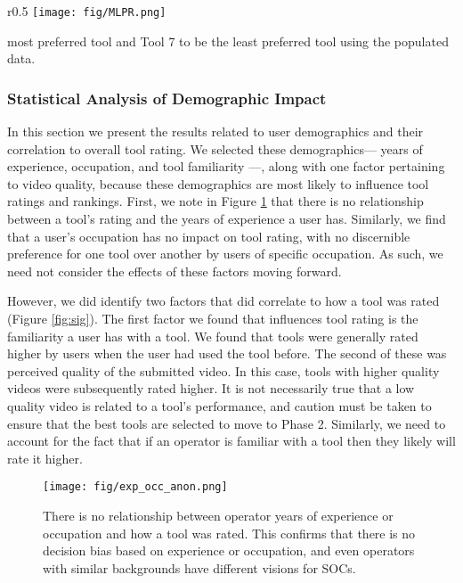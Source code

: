 \begin{wrapfigure}[10]{r}{0.5\textwidth}
    \vspace{-30pt}
    \centering
    \texttt{[image: fig/MLPR.png]}
    \captionsetup{font = scriptsize}
    \vspace{-10pt}
    \caption{PageRank graphical network from populated data based on ML algorithms.}
    \label{fig:MLresults}
\end{wrapfigure}
most preferred tool and Tool 7 to be the least preferred tool using the populated data. 

\subsubsection{Statistical Analysis of Demographic Impact}\label{correlation}
In this section we present the results related to user demographics and their correlation to overall tool rating. We selected these demographics--- years of experience, occupation, and tool familiarity ---, along with one factor pertaining to video quality, because these demographics are most likely to influence tool ratings and rankings. First, we note in Figure \ref{fig:exp} that there is no relationship between a tool's rating and the years of experience a user has. Similarly, we find that a user's occupation has no impact on tool rating, with no discernible preference for one tool over another by users of specific occupation. As such, we need not consider the effects of these factors moving forward.

However, we did identify two factors that did correlate to how a tool was rated (Figure \ref{fig:sig}). The first factor we found that influences tool rating is the familiarity a user has with a tool. We found that tools were generally rated higher by users when the user had used the tool before. The second of these was perceived quality of the submitted video. In this case, tools with higher quality videos were subsequently rated higher. It is not necessarily true that a low quality video is related to a tool's performance, and caution must be taken to ensure that the best tools are selected to move to Phase 2. Similarly, we need to account for the fact that if an operator is familiar with a tool then they likely will rate it higher.

\begin{figure}
    \vspace{-15pt}
    \centering
    \texttt{[image: fig/exp\_occ\_anon.png]}
    \captionsetup{font = scriptsize}
    \caption{There is no relationship between operator years of experience or occupation and how a tool was rated. This confirms that there is no decision bias based on experience or occupation, and even operators with similar backgrounds have different visions for SOCs.}
    \label{fig:exp}
\end{figure}

